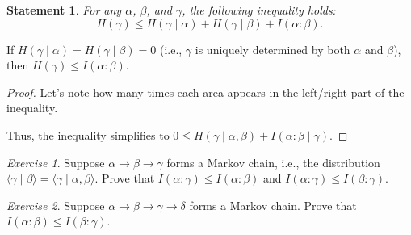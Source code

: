 \documentclass[12pt,sans]{article}
\theoremstyle{definition}
\theoremstyle{plain}
\newtheorem{statement}{Statement}[section]
\theoremstyle{remark}
\newtheorem{exercise}{Exercise}[section]
\begin{document}
\begin{statement}\label{st:someentropyineq}
    For any \(\alpha\), \(\beta\), and \(\gamma\), the following inequality holds:
    \[
        H(\gamma) \le H(\gamma \mid \alpha) + H(\gamma \mid \beta) + I(\alpha : \beta).
    \]
\end{statement}
If \(H(\gamma \mid \alpha) = H(\gamma \mid \beta) = 0\)
(i.e., \(\gamma\) is uniquely determined by both \(\alpha\) and \(\beta\)),
then \(H(\gamma) \le I(\alpha : \beta)\).
\begin{proof}
    Let’s note how many times each area appears in the left/right part of the inequality.
    \begin{center}
    \end{center}
    Thus, the inequality simplifies to \(0 \le H(\gamma \mid \alpha, \beta) +
    I(\alpha : \beta \mid \gamma)\).
\end{proof}
\begin{exercise}
    Suppose \(\alpha \to \beta \to \gamma\) forms a Markov chain, i.e., the distribution
    \(\langle \gamma \mid \beta \rangle = \langle \gamma \mid \alpha, \beta \rangle\).
    Prove that \(I(\alpha : \gamma) \le I(\alpha : \beta)\) and \(I(\alpha : \gamma) \le I(\beta : \gamma)\).
\end{exercise}
\begin{exercise}
    Suppose \(\alpha \to \beta \to \gamma \to \delta\) forms a Markov chain.
    Prove that \(I(\alpha : \beta) \le I(\beta : \gamma)\).
\end{exercise}
\end{document}
